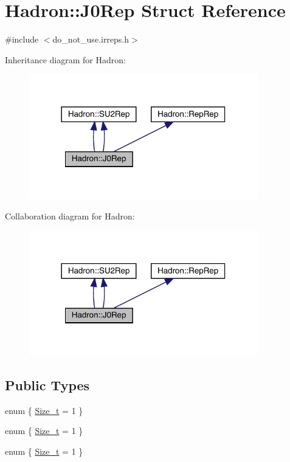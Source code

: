 \hypertarget{structHadron_1_1J0Rep}{}\section{Hadron\+:\+:J0\+Rep Struct Reference}
\label{structHadron_1_1J0Rep}


{\ttfamily \#include $<$do\+\_\+not\+\_\+use.\+irreps.\+h$>$}



Inheritance diagram for Hadron\+:\nopagebreak
\begin{figure}[H]
\begin{center}
\leavevmode
\includegraphics[width=282pt]{d1/dac/structHadron_1_1J0Rep__inherit__graph}
\end{center}
\end{figure}


Collaboration diagram for Hadron\+:\nopagebreak
\begin{figure}[H]
\begin{center}
\leavevmode
\includegraphics[width=282pt]{df/d4c/structHadron_1_1J0Rep__coll__graph}
\end{center}
\end{figure}
\subsection*{Public Types}
\begin{DoxyCompactItemize}
\item 
enum \{ \mbox{\hyperlink{structHadron_1_1J0Rep_afc3e4decdde93ed9eb3764e7ee3d3e4da9fdf35798851a37205e81b7c3aa9ed49}{Size\+\_\+t}} = 1
 \}
\item 
enum \{ \mbox{\hyperlink{structHadron_1_1J0Rep_afc3e4decdde93ed9eb3764e7ee3d3e4da9fdf35798851a37205e81b7c3aa9ed49}{Size\+\_\+t}} = 1
 \}
\item 
enum \{ \mbox{\hyperlink{structHadron_1_1J0Rep_afc3e4decdde93ed9eb3764e7ee3d3e4da9fdf35798851a37205e81b7c3aa9ed49}{Size\+\_\+t}} = 1
 \}
\end{DoxyCompactItemize}
